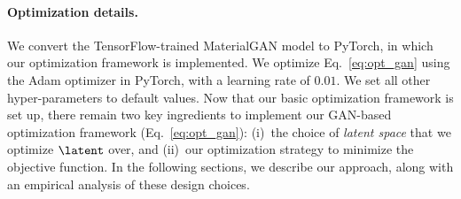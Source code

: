 \paragraph{Optimization details.}
We convert the TensorFlow-trained MaterialGAN model to PyTorch, in which our optimization framework is implemented. We optimize Eq.~\ref{eq:opt_gan} using the Adam optimizer in PyTorch, with a learning rate of $0.01$. We set all other hyper-parameters to default values.
%
Now that our basic optimization framework is set up, there remain two key ingredients to implement our GAN-based optimization framework (Eq.~\eqref{eq:opt_gan}): (i)~the choice of \emph{latent space} that we optimize $\latent$ over, and (ii)~our optimization strategy to minimize the objective function. In the following sections, we describe our approach, along with an empirical analysis of these design choices.
%

%
